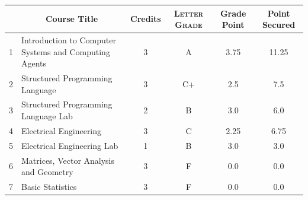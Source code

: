 \documentclass[11pt]{article}
\newcommand*{\numtwo}[1]{\pgfmathprintnumber[
                    fixed, precision=2, fixed zerofill=true]{#1}}
\begin{document}
                \begin{center}
                    \renewcommand{\arraystretch}{1.08}
                    
                \begin{tabular}{|c|l|c|>{\scshape}c|c|c|}
                \hline  \rule[-1ex]{0pt}{3.5ex} {\centering{\bf Course Code}} &  \multicolumn{1}{c|}{\textbf{Course Title}}  & {\bf Credits} & {\bf Letter Grade} & {\bf Grade Point} & {\bf Point Secured}  \\ 
                \hline   1 &  Introduction to Computer Systems and Computing Agents		 & 3 & A & 3.75 & 11.25 \\ %
                \hline   2 &  Structured Programming Language		 & 3 & C+ & 2.5 & 7.5 \\ %
                \hline   3 &  Structured Programming Language Lab		 & 2 & B & 3.0 & 6.0 \\ %
                \hline   4 &  Electrical Engineering		 & 3 & C & 2.25 & 6.75 \\ %
                \hline   5 &  Electrical Engineering Lab		 & 1 & B & 3.0 & 3.0 \\ %
                \hline   6 &  Matrices, Vector Analysis and Geometry		 & 3 & F & 0.0 & 0.0 \\ %
                \hline   7 &  Basic Statistics		 & 3 & F & 0.0 & 0.0 \\ %

\hline                %
                \end{tabular}
                \end{center}
                \renewcommand{\arraystretch}{1.03}
\end{document}
